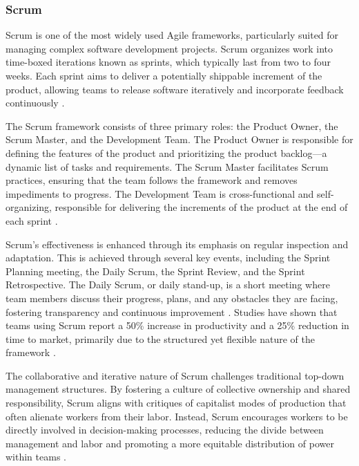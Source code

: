 \begin{refsection}
\subsubsection{Scrum}

Scrum is one of the most widely used Agile frameworks, particularly suited for managing complex software development projects. Scrum organizes work into time-boxed iterations known as sprints, which typically last from two to four weeks. Each sprint aims to deliver a potentially shippable increment of the product, allowing teams to release software iteratively and incorporate feedback continuously \cite[pp.~23-46]{rubin2014essential}.

The Scrum framework consists of three primary roles: the Product Owner, the Scrum Master, and the Development Team. The Product Owner is responsible for defining the features of the product and prioritizing the product backlog—a dynamic list of tasks and requirements. The Scrum Master facilitates Scrum practices, ensuring that the team follows the framework and removes impediments to progress. The Development Team is cross-functional and self-organizing, responsible for delivering the increments of the product at the end of each sprint \cite[pp.~23-46]{rubin2014essential}.

Scrum’s effectiveness is enhanced through its emphasis on regular inspection and adaptation. This is achieved through several key events, including the Sprint Planning meeting, the Daily Scrum, the Sprint Review, and the Sprint Retrospective. The Daily Scrum, or daily stand-up, is a short meeting where team members discuss their progress, plans, and any obstacles they are facing, fostering transparency and continuous improvement \cite[pp.~65-66]{rubin2014essential}. Studies have shown that teams using Scrum report a 50\% increase in productivity and a 25\% reduction in time to market, primarily due to the structured yet flexible nature of the framework \cite[pp.~70-71]{rubin2014essential}.

The collaborative and iterative nature of Scrum challenges traditional top-down management structures. By fostering a culture of collective ownership and shared responsibility, Scrum aligns with critiques of capitalist modes of production that often alienate workers from their labor. Instead, Scrum encourages workers to be directly involved in decision-making processes, reducing the divide between management and labor and promoting a more equitable distribution of power within teams \cite[pp.~19-25]{williams2000strengthening}.


\end{refsection}
